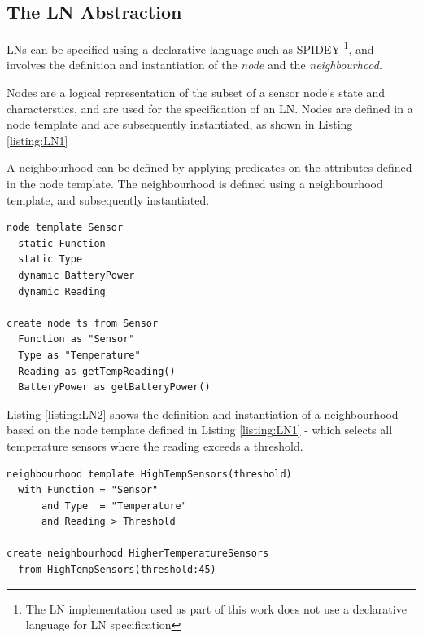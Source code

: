 \subsection{The LN Abstraction}

LNs can be specified using a declarative language such as SPIDEY
\cite{mottola_LN:2006, mottola_LNScoping:2006}\footnote{The LN implementation
used as part of this work does not use a declarative language for LN specification}, and
involves the definition and instantiation of the \emph{node} and the
\emph{neighbourhood}. 

Nodes are a logical representation of the subset of a sensor node's state and
characterstics, and are used for the specification of an LN. Nodes are defined
in a node template and are subsequently instantiated, as shown in Listing \ref{listing:LN1}
   
A neighbourhood can be defined by applying predicates on the attributes defined
in the node template. The neighbourhood is defined using a neighbourhood
template, and subsequently instantiated.
   
\begin{lstlisting}[frame=trbl, basewidth={0.55em, 0.6em}, captionpos=b, 
basicstyle=\ttfamily\footnotesize, breaklines, caption = Node Definition and Instantiation, label = listing:LN1]  
node template Sensor
  static Function
  static Type
  dynamic BatteryPower
  dynamic Reading

create node ts from Sensor
  Function as "Sensor"
  Type as "Temperature"
  Reading as getTempReading()
  BatteryPower as getBatteryPower()
\end{lstlisting}


Listing \ref{listing:LN2} shows the definition and
instantiation of a
neighbourhood - based on the node template defined in Listing \ref{listing:LN1}
- which selects all temperature sensors where the reading exceeds a threshold.
 
\begin{lstlisting}[frame=trbl, basewidth={0.55em, 0.6em}, captionpos=b, 
basicstyle=\ttfamily\footnotesize, breaklines, caption = Neighbourhood Definition and Instantiation, label = listing:LN2]  
neighbourhood template HighTempSensors(threshold)
  with Function = "Sensor" 
      and Type  = "Temperature" 
      and Reading > Threshold

create neighbourhood HigherTemperatureSensors
  from HighTempSensors(threshold:45)
\end{lstlisting}

